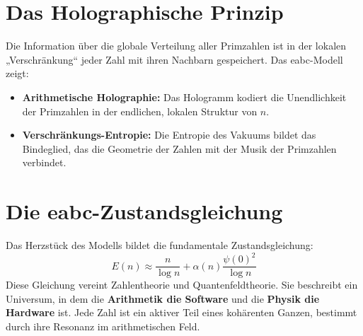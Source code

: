 \documentclass[11pt,a4paper]{article}
\begin{document}
	\section{Das Holographische Prinzip}
	Die Information über die globale Verteilung aller Primzahlen ist in der lokalen „Verschränkung“ jeder Zahl mit ihren Nachbarn gespeichert. Das eabc-Modell zeigt:
	\begin{itemize}
		\item \textbf{Arithmetische Holographie:} Das Hologramm kodiert die Unendlichkeit der Primzahlen in der endlichen, lokalen Struktur von $n$.
		\item \textbf{Verschränkungs-Entropie:} Die Entropie des Vakuums bildet das Bindeglied, das die Geometrie der Zahlen mit der Musik der Primzahlen verbindet.
	\end{itemize}
	
	\section{Die eabc-Zustandsgleichung}
	Das Herzstück des Modells bildet die fundamentale Zustandsgleichung:
	\begin{equation}
		E(n) \approx \frac{n}{\log n} + \alpha(n) \frac{\psi(0)^2}{\log n}
	\end{equation}
	Diese Gleichung vereint Zahlentheorie und Quantenfeldtheorie. Sie beschreibt ein Universum, in dem die \textbf{Arithmetik die Software} und die \textbf{Physik die Hardware} ist. Jede Zahl ist ein aktiver Teil eines kohärenten Ganzen, bestimmt durch ihre Resonanz im arithmetischen Feld.
	
\end{document}
